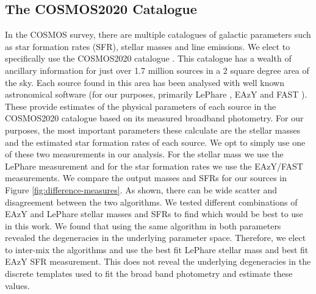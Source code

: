 \subsection{The COSMOS2020 Catalogue}
In the COSMOS survey, there are multiple catalogues of galactic parameters such as star formation rates (SFR), stellar masses and line emissions. We elect to specifically use the COSMOS2020 catalogue \citep{2022ApJS..258...11W}. This catalogue has a wealth of ancillary information for just over 1.7 million sources in a 2 square degree area of the sky. Each source found in this area has been analysed with well known astronomical software (for our purposes, primarily  LePhare \citep{1999MNRAS.310..540A, 2006A&A...457..841I}, EAzY \citep{2008ApJ...686.1503B} and FAST \citep{2017MNRAS.465.3390A}). These provide estimates of the physical parameters of each source in the COSMOS2020 catalogue based on its measured broadband photometry. For our purposes, the most important parameters these calculate are the stellar masses and the estimated star formation rates of each source. We opt to simply use one of these two measurements in our analysis. For the stellar mass we use the LePhare measurement and for the star formation rates we use the EAzY/FAST measurements. We compare the output masses and SFRs for our sources in Figure \ref{fig:difference-measures}. As shown, there can be wide scatter and disagreement between the two algorithms. We tested different combinations of EAzY and LePhare stellar masses and SFRs to find which would be best to use in this work. We found that using the same algorithm in both parameters revealed the degeneracies in the underlying parameter space. Therefore, we elect to inter-mix the algorithms and use the best fit LePhare stellar mass and best fit EAzY SFR measurement. This does not reveal the underlying degeneracies in the discrete templates used to fit the broad band photometry and estimate these values.

